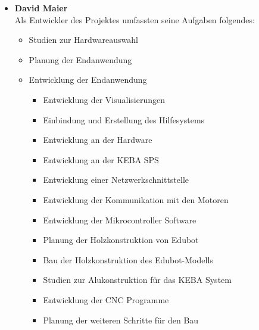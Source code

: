\begin{itemize}
\item \textbf{David Maier}\\
Als Entwickler des Projektes umfassten seine Aufgaben folgendes:
\begin{itemize}
\item Studien zur Hardwareauswahl
\item Planung der Endanwendung
\item Entwicklung der Endanwendung
\begin{itemize}
\item Entwicklung der Visualisierungen
\item Einbindung und Erstellung des Hilfesystems
\end{itemize}
\begin{itemize}
\item Entwicklung an der Hardware
\end{itemize}
\begin{itemize}
\item Entwicklung an der KEBA SPS
\item Entwicklung einer Netzwerkschnittstelle 
\item Entwicklung der Kommunikation mit den Motoren
\item Entwicklung der Mikrocontroller Software
\item Planung der Holzkonstruktion von Edubot
\item Bau der Holzkonstruktion des Edubot-Modells
\item Studien zur Alukonstruktion für das KEBA System
\item Entwicklung der CNC Programme
\item Planung der weiteren Schritte für den Bau
\end{itemize}
\end{itemize}




\end{itemize}
